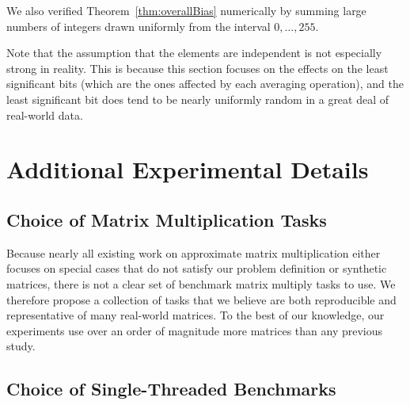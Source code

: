 We also verified Theorem~\ref{thm:overallBias} numerically by summing large numbers of integers drawn uniformly from the interval $0,\ldots,255$.

Note that the assumption that the elements are independent is not especially strong in reality. This is because this section focuses on the effects on the least significant bits (which are the ones affected by each averaging operation), and the least significant bit does tend to be nearly uniformly random in a great deal of real-world data.

\vfill\break  %
\section{Additional Experimental Details} \label{sec:experimentDetails}

\subsection{Choice of Matrix Multiplication Tasks}

Because nearly all existing work on approximate matrix multiplication either focuses on special cases that do not satisfy our problem definition \cite{quickerAdc, pq, opq} or synthetic matrices, there is not a clear set of benchmark matrix multiply tasks to use. We therefore propose a collection of tasks that we believe are both reproducible and representative of many real-world matrices. To the best of our knowledge, our experiments use over an order of magnitude more matrices than any previous study.

\subsection{Choice of Single-Threaded Benchmarks} \label{appendix:onethread}

